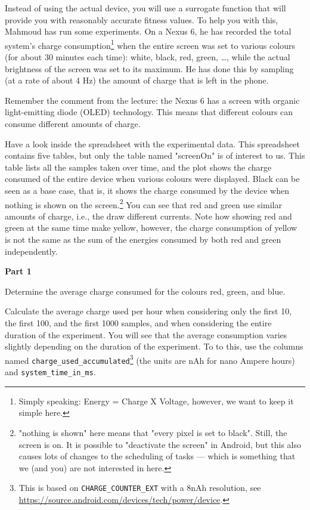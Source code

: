 \documentclass{pracs}
\begin{document}
Instead of using the actual device, you will use a surrogate function that will provide you with reasonably accurate fitness values. To help you with this, Mahmoud has run some experiments. On a Nexus 6, he has recorded the total system's charge consumption\footnote{Simply speaking: Energy = Charge X Voltage, however, we want to keep it simple here.} when the entire screen was set to various colours (for about 30 minutes each time): white, black, red, green, \ldots, while the actual brightness of the screen was set to its maximum. He has done this by sampling (at a rate of about 4 Hz) the amount of charge that is left in the phone.

Remember the comment from the lecture: the Nexus 6 has a screen with organic light-emitting diode (OLED) technology. This means that different colours can consume different amounts of charge.

Have a look inside the spreadsheet with the experimental data. This spreadsheet contains five tables, but only the table named "screenOn" is of interest to us. This table lists all the samples taken over time, and the plot shows the charge consumed of the entire device when various colours were displayed. 
Black can be seen as a base case, that is, it shows the charge consumed by the device when nothing is shown on the screen.\footnote{"nothing is shown" here means that "every pixel is set to black". Still, the screen is on. It is possible to  "deactivate the screen" in Android, but this also causes lots of changes to the scheduling of tasks --- which is something that we (and you) are not interested in here.} 
You can see that red and green use similar amounts of charge, i.e., the draw different currents. Note how showing red and green at the same time make yellow, however, the charge consumption of yellow is not the same as the sum of the energies consumed by both red and green independently.

\noindent\textbf{Part 1}

Determine the average charge consumed for the colours red, green, and blue. 

Calculate the average charge used per hour when considering only the first 10, the first 100, and the first 1000 samples, and when considering the entire duration of the experiment. You will see that the average consumption varies slightly depending on the duration of the experiment. To to this, use the columns named \texttt{charge\_used\_accumulated}\footnote{This is based on \texttt{CHARGE\_COUNTER\_EXT} with a 8nAh resolution, see \url{https://source.android.com/devices/tech/power/device}.} (the units are nAh for nano Ampere hours) and \texttt{system\_time\_in\_ms}. 
\end{document}
